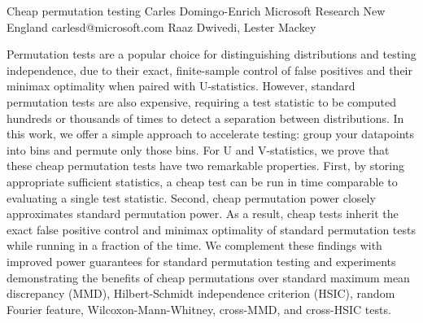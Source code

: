 \begin{talk}
  {Cheap permutation testing}%
  {Carles Domingo-Enrich}%
  {Microsoft Research New England}%
  {carlesd@microsoft.com}%
  {Raaz Dwivedi, Lester Mackey}%
  
    
   
Permutation tests are a popular choice for distinguishing distributions and testing independence, due to their exact, finite-sample control of false positives and their minimax optimality when paired with U-statistics. However, standard permutation tests are also expensive, requiring a test statistic to be computed hundreds or thousands of times to detect a separation between distributions. In this work, we offer a simple approach to accelerate testing: group your datapoints into bins and permute only those bins. For U and V-statistics, we prove that these cheap permutation tests have two remarkable properties. First, by storing appropriate sufficient statistics, a cheap test can be run in time comparable to evaluating a single test statistic. Second, cheap permutation power closely approximates standard permutation power. As a result, cheap tests inherit the exact false positive control and minimax optimality of standard permutation tests while running in a fraction of the time. We complement these findings with improved power guarantees for standard permutation testing and experiments demonstrating the benefits of cheap permutations over standard maximum mean discrepancy (MMD), Hilbert-Schmidt independence criterion (HSIC), random Fourier feature, Wilcoxon-Mann-Whitney, cross-MMD, and cross-HSIC tests.



\end{talk}

